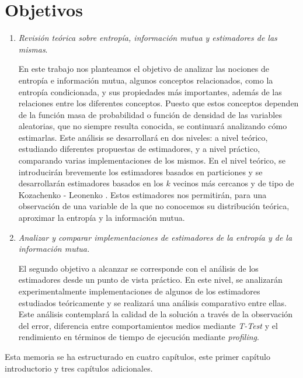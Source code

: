 \documentclass[12pt,a4paper]{report} %
\theoremstyle{definition}
\begin{document}
\section{Objetivos}
\begin{enumerate}
\item \textit{Revisión teórica sobre entropía, información mutua y estimadores de las mismas}.

  En este trabajo nos planteamos el objetivo de analizar las nociones de entropía e información mutua, algunos conceptos relacionados, como la entropía condicionada, y sus propiedades más importantes, además de las relaciones entre los diferentes conceptos. Puesto que estos conceptos dependen de la función masa de probabilidad o función de densidad de las variables aleatorias, que no siempre resulta conocida, se continuará analizando cómo estimarlas. Este análisis se desarrollará en dos niveles: a nivel teórico, estudiando diferentes propuestas de estimadores, y a nivel práctico, comparando varias implementaciones de los mismos. En el nivel teórico, se introducirán brevemente los estimadores basados en particiones y se desarrollarán estimadores basados en los $k$ vecinos más cercanos y de tipo de Kozachenko - Leonenko \cite{kraskov}. Estos estimadores nos permitirán, para una observación de una variable de la que no conocemos su distribución teórica, aproximar la entropía y la información mutua.
  
\item \textit{Analizar y comparar implementaciones de estimadores de la entropía y de la información mutua.}
  
 El segundo objetivo a alcanzar se corresponde con el análisis de los estimadores desde un punto de vista práctico. En este nivel, se analizarán experimentalmente implementaciones de algunos de los estimadores estudiados teóricamente y se realizará una análisis comparativo entre ellas. Este análisis contemplará la calidad de la solución a través de la observación del error, diferencia entre comportamientos medios mediante \textit{T-Test} y el rendimiento en términos de tiempo de ejecución mediante \textit{profiling}.\\
\end{enumerate}


Esta memoria se ha estructurado en cuatro capítulos, este primer capítulo introductorio y tres capítulos adicionales.\\
\end{document}

